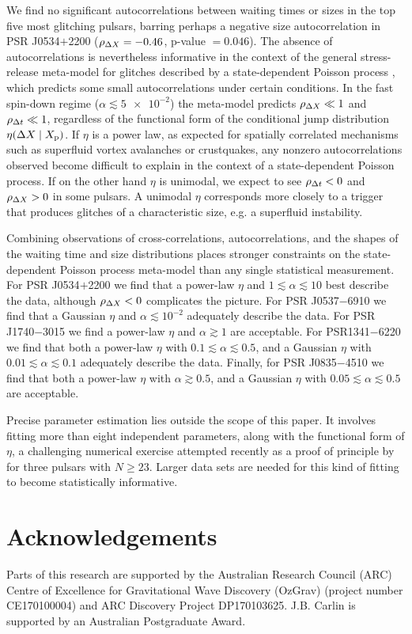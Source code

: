 We find no significant autocorrelations between waiting times or sizes in the top five most glitching pulsars, barring perhaps a negative size autocorrelation in PSR J0534$+$2200 ($\rho_{\Delta X} = -0.46$, p-value $=0.046$). The absence of autocorrelations is nevertheless informative in the context of the general stress-release meta-model for glitches described by a state-dependent Poisson process \citep{Fulgenzi2017}, which predicts some small autocorrelations under certain conditions. In the fast spin-down regime ($\alpha \lesssim \num{5e-2}$) the meta-model predicts $\rho_{\Delta X} \ll 1$ and $\rho_{\Delta t} \ll 1$, regardless of the functional form of the conditional jump distribution $\eta(\Delta X \mid X_{\textrm{p}})$. If $\eta$ is a power law, as expected for spatially correlated mechanisms such as superfluid vortex avalanches or crustquakes, any nonzero autocorrelations observed become difficult to explain in the context of a state-dependent Poisson process. If on the other hand $\eta$ is unimodal, we expect to see $\rho_{\Delta t} < 0$ and $\rho_{\Delta X} > 0$ in some pulsars. A unimodal $\eta$ corresponds more closely to a trigger that produces glitches of a characteristic size, e.g. a superfluid instability.

Combining observations of cross-correlations, autocorrelations, and the shapes of the waiting time and size distributions places stronger constraints on the state-dependent Poisson process meta-model than any single statistical measurement. For PSR J0534$+$2200 we find that a power-law $\eta$ and $1 \lesssim \alpha \lesssim 10$ best describe the data, although $\rho_{\Delta X} < 0$ complicates the picture. For PSR J0537$-$6910 we find that a Gaussian $\eta$ and $\alpha \lesssim 10^{-2}$ adequately describe the data. For PSR J1740$-$3015 we find a power-law $\eta$ and $\alpha \gtrsim 1$ are acceptable. For PSR1341$-$6220 we find that both a power-law $\eta$ with $0.1 \lesssim \alpha \lesssim 0.5$, and a Gaussian $\eta$ with $0.01 \lesssim \alpha \lesssim 0.1$ adequately describe the data. Finally, for PSR J0835$-$4510 we find that both a power-law $\eta$ with $\alpha \gtrsim 0.5$, and a Gaussian $\eta$ with $0.05 \lesssim \alpha \lesssim 0.5$ are acceptable. 

Precise parameter estimation lies outside the scope of this paper. It involves fitting more than eight independent parameters, along with the functional form of $\eta$, a challenging numerical exercise attempted recently as a proof of principle by \citet{Melatos2019} for three pulsars with $N \geq 23$. Larger data sets are needed for this kind of fitting to become statistically informative. 

\section*{Acknowledgements}
Parts of this research are supported by the Australian Research Council (ARC) Centre
of Excellence for Gravitational Wave Discovery (OzGrav) (project number
CE170100004) and ARC Discovery Project DP170103625. J.B. Carlin is supported by an Australian Postgraduate Award.
